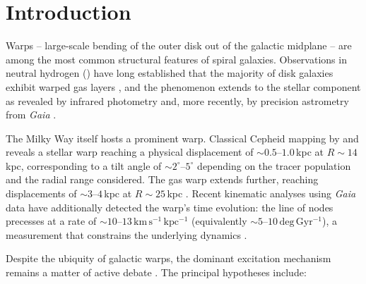 \section{Introduction}
\label{sec:intro}

Warps -- large-scale bending of the outer disk out of the galactic midplane -- are among the most common structural features of spiral galaxies. Observations in neutral hydrogen () have long established that the majority of disk galaxies exhibit warped gas layers \citep{garciaruiz2002, kruit2007}, and the phenomenon extends to the stellar component as revealed by infrared photometry and, more recently, by precision astrometry from \textit{Gaia} \citep{poggio2020, chen2019, skowron2019}.

The Milky Way itself hosts a prominent warp. Classical Cepheid mapping by \citet{chen2019} and \citet{skowron2019} reveals a stellar warp reaching a physical displacement of ${\sim}0.5$--$1.0$\,kpc at $R\sim14$\,kpc, corresponding to a tilt angle of ${\sim}2^\circ$--$5^\circ$ depending on the tracer population and the radial range considered. The  gas warp extends further, reaching displacements of ${\sim}3$--$4$\,kpc at $R\sim25$\,kpc \citep{bland2016}. Recent kinematic analyses using \textit{Gaia} data have additionally detected the warp's time evolution: the line of nodes precesses at a rate of ${\sim}10$--$13\,\mathrm{km\,s^{-1}\,kpc^{-1}}$ (equivalently ${\sim}5$--$10\,\mathrm{deg\,Gyr^{-1}}$), a measurement that constrains the underlying dynamics \citep{poggio2020, cheng2020}.

Despite the ubiquity of galactic warps, the dominant excitation mechanism remains a matter of active debate \citep[see][for reviews]{binney1992, bland2016}. The principal hypotheses include:

